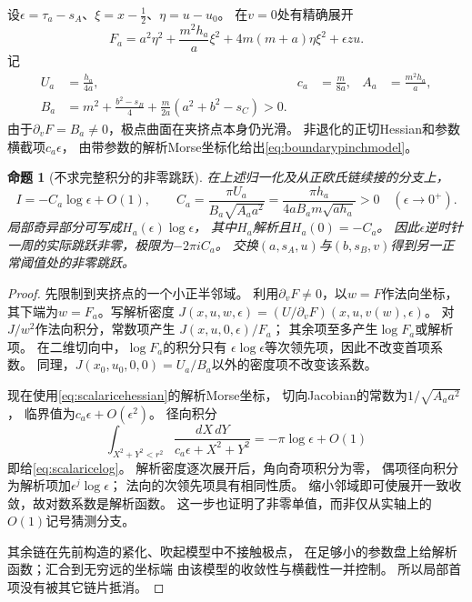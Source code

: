 \documentclass[11pt,a4paper]{ctexart}
\theoremstyle{cnplain}\newtheorem{theorem}{定理}[section]
\newtheorem{proposition}[theorem]{命题}
\theoremstyle{definition}\newtheorem{definition}[theorem]{定义}
\theoremstyle{remark}\newtheorem{remark}[theorem]{注}
\begin{document}
设$\epsilon=\tau_a-s_A$、$\xi=x-\tfrac12$、$\eta=u-u_0$。
在$v=0$处有精确展开
\begin{equation}\label{eq:scalaricehessian}
 F_a=a^2\eta^2+\frac{m^2h_a}{a}\xi^2
       +4m(m+a)\eta\xi^2+\epsilon zu.
\end{equation}
记
\begin{align}
 U_a&=\frac{h_a}{4a},&
 c_a&=\frac{m}{8a},&
 A_a&=\frac{m^2h_a}{a},\nonumber\\
 B_a&=m^2+\frac{b^2-s_B}{4}
             +\frac{m}{2a}(a^2+b^2-s_C)>0.\label{eq:scalariceconstants}
\end{align}
由于$\partial_vF=B_a\ne0$，极点曲面在夹挤点本身仍光滑。
非退化的正切Hessian和参数横截项$c_a\epsilon$，
由带参数的解析Morse坐标化给出\eqref{eq:boundarypinchmodel}。

\begin{proposition}[不求完整积分的非零跳跃]\label{prop:scalaricelog}
在上述归一化及从正欧氏链续接的分支上，
\begin{equation}\label{eq:scalaricelog}
 I=-C_a\log\epsilon+O(1),\qquad
 C_a=\frac{\pi U_a}{B_a\sqrt{A_aa^2}}
     =\frac{\pi h_a}{4a B_a m\sqrt{a h_a}}>0
 \quad(\epsilon\longrightarrow0^+).
\end{equation}
局部奇异部分可写成$H_a(\epsilon)\log\epsilon$，
其中$H_a$解析且$H_a(0)=-C_a$。
因此$\epsilon$逆时针一周的实际跳跃非零，极限为$-2\pi iC_a$。
交换$(a,s_A,u)$与$(b,s_B,v)$得到另一正常阈值处的非零跳跃。
\end{proposition}
\begin{proof}
先限制到夹挤点的一个小正半邻域。
利用$\partial_vF\ne0$，以$w=F$作法向坐标，
其下端为$w=F_a$。写解析密度
$J(x,u,w,\epsilon)=(U/\partial_vF)(x,u,v(w),\epsilon)$。
对$J/w^2$作法向积分，常数项产生
$J(x,u,0,\epsilon)/F_a$；
其余项至多产生$\log F_a$或解析项。
在二维切向中，$\log F_a$的积分只有
$\epsilon\log\epsilon$等次领先项，因此不改变首项系数。
同理，$J(x_0,u_0,0,0)=U_a/B_a$以外的密度项不改变该系数。

现在使用\eqref{eq:scalaricehessian}的解析Morse坐标，
切向Jacobian的常数为$1/\sqrt{A_aa^2}$，
临界值为$c_a\epsilon+O(\epsilon^2)$。
径向积分
\[
 \int_{X^2+Y^2<r^2}
       \frac{dX\,dY}{c_a\epsilon+X^2+Y^2}
       =-\pi\log\epsilon+O(1)
\]
即给\eqref{eq:scalaricelog}。
解析密度逐次展开后，角向奇项积分为零，
偶项径向积分为解析项加$\epsilon^j\log\epsilon$；
法向的次领先项具有相同性质。
缩小邻域即可使展开一致收敛，故对数系数是解析函数。
这一步也证明了非零单值，而非仅从实轴上的$O(1)$记号猜测分支。

其余链在先前构造的紧化、吹起模型中不接触极点，
在足够小的参数盘上给解析函数；汇合到无穷远的坐标端
由该模型的收敛性与横截性一并控制。
所以局部首项没有被其它链片抵消。
\end{proof}
\end{document}
